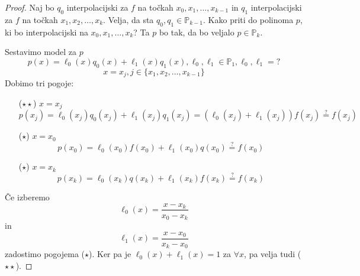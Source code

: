 \documentclass[a4paper,12pt]{article}
\theoremstyle{definition}
\theoremstyle{remark}
\newcommand{\Pp}{\mathbb{P}}
\begin{document}
\begin{proof}
    Naj bo $q_0$ interpolacijski za $f$ na točkah $x_0, x_1, \dots, x_{k-1}$ in $q_1$ interpolacijski za $f$ na točkah $x_1, x_2, \dots, x_k$.
    Velja, da sta $q_0, q_1 \in \Pp_{k-1}$.
    Kako priti do polinoma $p$, ki bo interpolacijski na $x_0, x_1, \dots, x_k$? Ta $p$ bo tak, da bo veljalo $p \in \Pp_k$.

    Sestavimo model za $p$
    \begin{equation*}
        p(x) = \ell_0(x) q_0(x) + \ell_1(x) q_1(x), \ell_0, \ell_1 \in \Pp_1, \ell_0, \ell_1 = ?
    \end{equation*}
    \begin{equation*}
        x = x_j, j \in \{x_1, x_2, \dots, x_{k-1}\}
    \end{equation*}
    Dobimo tri pogoje:
    \begin{itemize}

        \item[($\star \star$)] $x = x_j$
        \begin{equation*}
            p(x_j) = \ell_0(x_j) q_0 (x_j) + \ell_1 (x_j) q_1 (x_j) = (\ell_0 (x_j) + \ell_1 (x_j)) f(x_j) \stackrel{\text{?}}{=} f(x_j)
        \end{equation*}

        \item[($\star$)] $x = x_0$
        \begin{equation*}
            p(x_0) = \ell_0(x_0) f(x_0) + \ell_1 (x_0) q(x_0) \stackrel{\text{?}}{=} f(x_0)
        \end{equation*}

        \item[($\star$)] $x = x_k$
        \begin{equation*}
            p(x_k) = \ell_0 (x_k) q(x_k) + \ell_1(x_k) f(x_k) \stackrel{\text{?}}{=} f(x_k)
        \end{equation*}

    \end{itemize}
    
    Če izberemo
    \begin{equation*}
        \ell_0(x) = \frac{x - x_k}{x_0 - x_k}
    \end{equation*}
    in
    \begin{equation*}
        \ell_1(x) = \frac{x - x_0}{x_k - x_0}
    \end{equation*}
    zadostimo pogojema ($\star$). Ker pa je $\ell_0(x) + \ell_1(x) = 1$ za $\forall x$, pa velja tudi ($\star \star$).


\end{proof}
\end{document}
